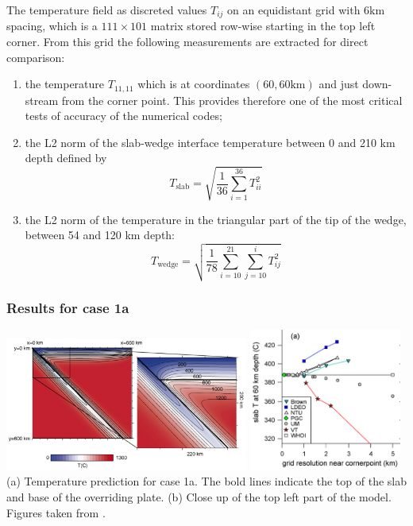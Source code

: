 The temperature field as discreted values $T_{ij}$ on
an equidistant grid with $6\text{km}$ spacing, which is a $111\times101$ 
matrix stored row-wise starting in the top left corner. 
From this grid the following measurements are extracted for direct comparison:

\begin{enumerate}
\item the temperature $T_{11,11}$ which is at coordinates $(60, 60\text{km})$ 
and just down-stream from the corner point. This provides therefore
one of the most critical tests of accuracy of the numerical codes;

\item the L2 norm of the slab-wedge interface temperature between
0 and 210 km depth defined by
\[
T_{\text{slab}} = \sqrt{\frac{1}{36}\sum_{i=1}^{36} T_{ii}^2}
\]

\item the L2 norm of the temperature in the triangular part of the
tip of the wedge, between 54 and 120 km depth:
\[
T_{\text{wedge}} = \sqrt{ \frac{1}{78} \sum_{i=10}^{21} \sum_{j=10}^i T_{ij}^2}
\]

\end{enumerate}

\subsubsection{Results for case 1a}

\begin{center}
\includegraphics[width=8cm]{python_codes/fieldstone_45/images/vack08_0}
\includegraphics[width=5cm]{python_codes/fieldstone_45/images/vack08_1}\\
{\small (a) Temperature prediction for case 1a. The bold lines indicate the top of the slab and base of the overriding plate. (b) Close up of the top left part of
the model. Figures taken from \cite{vack08}.}
\end{center}


